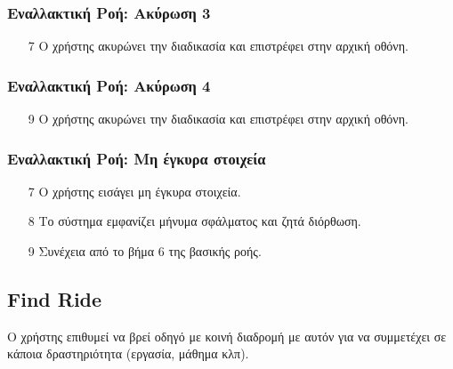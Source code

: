\documentclass[11pt]{article}
\begin{document}
\subsubsection{Εναλλακτική Ροή: Ακύρωση 3}

\begin{enumerate}
    \item[7] Ο χρήστης ακυρώνει την διαδικασία και επιστρέφει στην αρχική οθόνη.
\end{enumerate}

\subsubsection{Εναλλακτική Ροή: Ακύρωση 4}

\begin{enumerate}
    \item[9] Ο χρήστης ακυρώνει την διαδικασία και επιστρέφει στην αρχική οθόνη.
\end{enumerate}

\subsubsection{Εναλλακτική Ροή: Μη έγκυρα στοιχεία}

\begin{enumerate}
    \item[7] Ο χρήστης εισάγει μη έγκυρα στοιχεία.
    \item[8] Το σύστημα εμφανίζει μήνυμα σφάλματος και ζητά διόρθωση.
    \item[9] Συνέχεια από το βήμα 6 της βασικής ροής.
\end{enumerate}

\subsection{Find Ride}

Ο χρήστης επιθυμεί να βρεί οδηγό με κοινή διαδρομή με αυτόν για να συμμετέχει σε
κάποια δραστηριότητα (εργασία, μάθημα κλπ).
\end{document}
